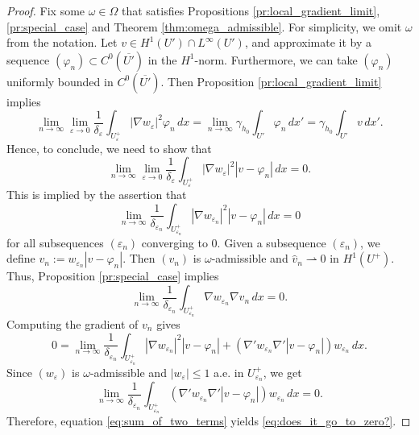 \documentclass{article}
\numberwithin{equation}{section}
\theoremstyle{definition}
\theoremstyle{remark}
\begin{document}
\begin{proof}
    Fix some $\omega \in \Omega$ that satisfies Propositions \ref{pr:local_gradient_limit}, \ref{pr:special_case} and Theorem \ref{thm:omega_admissible}. For simplicity, we omit $\omega$ from the notation. Let $v \in H^1(U') \cap L^\infty(U')$, and approximate it by a sequence $(\varphi_n) \subset C^0(\overline{U'})$ in the $H^1$-norm. Furthermore, we can take $(\varphi_n)$ uniformly bounded in $C^0(\overline{U'})$. Then Proposition \ref{pr:local_gradient_limit} implies
    \[
    \lim_{n \to \infty} \lim_{\varepsilon \to 0} \frac{1}{\delta_\varepsilon} \int_{U_\varepsilon^+} |\nabla w_\varepsilon|^2 \varphi_n \, dx = \lim_{n \to \infty} \gamma_{h_0} \int_{U'} \varphi_n \, dx' = \gamma_{h_0} \int_{U'} v \, dx'.
    \]
    Hence, to conclude, we need to show that
    \[
    \lim_{n \to \infty} \lim_{\varepsilon \to 0} \frac{1}{\delta_\varepsilon} \int_{U_\varepsilon^+} |\nabla w_\varepsilon|^2 |v - \varphi_n| \, dx = 0.
    \]
    This is implied by the assertion that
    \begin{equation} \label{eq:does_it_go_to_zero?}
        \lim_{n \to \infty} \frac{1}{\delta_{\varepsilon_n}} \int_{U_{\varepsilon_n}^+} |\nabla w_{\varepsilon_n}|^2 |v - \varphi_n| \, dx = 0
    \end{equation}
    for all subsequences $(\varepsilon_n)$ converging to $0$. Given a subsequence $(\varepsilon_n)$, we define $v_n := w_{\varepsilon_n}|v - \varphi_n|$. Then $(v_n)$ is $\omega$-admissible and $\hat{v}_n \rightharpoonup 0$ in $H^1(U^+)$. Thus, Proposition \ref{pr:special_case} implies
    \[
    \lim_{n \to \infty} \frac{1}{\delta_{\varepsilon_n}}\int_{U_{\varepsilon_n}^+} \nabla w_{\varepsilon_n} \nabla v_n \, dx = 0.
    \]
    Computing the gradient of $v_n$ gives
    \begin{equation} \label{eq:sum_of_two_terms}
        0 = \lim_{n \to \infty} \frac{1}{\delta_{\varepsilon_n}} \int_{U_{\varepsilon_n}^+} |\nabla w_{\varepsilon_n}|^2 |v - \varphi_n| + (\nabla' w_{\varepsilon_n} \nabla' |v - \varphi_n|) w_{\varepsilon_n} \, dx.
    \end{equation}
    Since $(w_\varepsilon)$ is $\omega$-admissible and $|w_\varepsilon| \le 1$ a.e. in $U_{\varepsilon_n}^+$, we get
    \[
     \lim_{n \to \infty} \frac{1}{\delta_{\varepsilon_n}} \int_{U_{\varepsilon_n}^+} (\nabla' w_{\varepsilon_n} \nabla' |v - \varphi_n|) w_{\varepsilon_n} \, dx = 0.
    \]
    Therefore, equation \eqref{eq:sum_of_two_terms} yields \eqref{eq:does_it_go_to_zero?}.
\end{proof}
\end{document}
